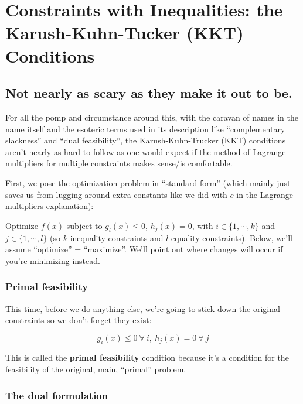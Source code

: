 \documentclass[letterpaper,12pt]{report}
\begin{document}
\newpage

\section{Constraints with Inequalities: the Karush-Kuhn-Tucker (KKT)
Conditions}\label{constraints-with-inequalities-the-karush-kuhn-tucker-kkt-conditions}

\subsection{Not nearly as scary as they make it out to
be.}\label{not-nearly-as-scary-as-they-make-it-out-to-be.}

For all the pomp and circumstance around this, with the caravan of names
in the name itself and the esoteric terms used in its description like
``complementary slackness'' and ``dual feasibility'', the
Karush-Kuhn-Trucker (KKT) conditions aren't nearly as hard to follow as
one would expect if the method of Lagrange multipliers for multiple
constraints makes sense/is comfortable.

First, we pose the optimization problem in ``standard form'' (which mainly
just saves us from lugging around extra constants like we did with \(c\)
in the Lagrange multipliers explanation):

Optimize \(f(x)\) subject to \(g_i(x)\leq 0\), \(h_j(x)=0\), with
\(i \in \{1, \cdots, k\}\) and \(j \in \{1, \cdots, l\}\) (so \(k\)
inequality constraints and \(l\) equality constraints). Below, we'll
assume ``optimize'' = ``maximize''. We'll point out where changes will occur
if you're minimizing instead.

\subsubsection{Primal feasibility}\label{primal-feasibility}

This time, before we do anything else, we're going to stick down the
original constraints so we don't forget they exist:

\[ g_i(x)\leq 0 \ \forall \ i, \ h_j(x) = 0 \ \forall \ j \]

This is called the \textbf{primal feasibility} condition because it's a
condition for the feasibility of the original, main, ``primal'' problem.

\subsubsection{The dual formulation}\label{the-dual-formulation}
\end{document}
